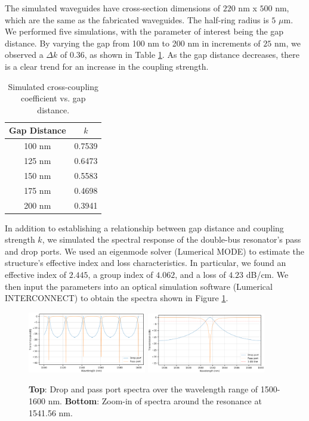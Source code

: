 \documentclass[letterpaper, 10 pt, conference]{ieeeconf}
\begin{document}
The simulated waveguides have cross-section dimensions of $220$ nm x $500$ nm, which are the same as the fabricated waveguides. The half-ring radius is $5$ $\mu$m. We performed five simulations, with the parameter of interest being the gap distance. By varying the gap from 100 nm to 200 nm in increments of $25$ nm, we observed a $\Delta k$ of $0.36$, as shown in Table \ref{tab:sim}. As the gap distance decreases, there is a clear trend for an increase in the coupling strength. 

\begin{table}[!ht]
\centering
\caption{Simulated cross-coupling coefficient vs. gap distance.}
\begin{tabular}{|c|c|}
\hline
\textbf{Gap Distance} & \textbf{$k$} \\ \hline
100 nm & 0.7539 \\ \hline
125 nm & 0.6473 \\ \hline
150 nm & 0.5583 \\ \hline
175 nm & 0.4698 \\ \hline
200 nm & 0.3941 \\ \hline
\end{tabular}
\label{tab:sim}
\end{table}

In addition to establishing a relationship between gap distance and coupling strength $k$, we simulated the spectral response of the double-bus resonator's pass and drop ports. We used an eigenmode solver (Lumerical MODE) to estimate the structure's effective index and loss characteristics. In particular, we found an effective index of $2.445$, a group index of $4.062$, and a loss of $4.23$ dB/cm. We then input the parameters into an optical simulation software (Lumerical INTERCONNECT) to obtain the spectra shown in Figure \ref{fig:simfull}.

\begin{figure}[!ht]
    \centering
    \includegraphics[width = 0.46\textwidth]{sim_full.png}
    \includegraphics[width = 0.46\textwidth]{sim_zoom.png}
    \caption{\textbf{Top}: Drop and pass port spectra over the wavelength range of 1500-1600 nm. \textbf{Bottom}: Zoom-in of spectra around the resonance at 1541.56 nm.}
    \label{fig:simfull}
\end{figure} 
\end{document}
